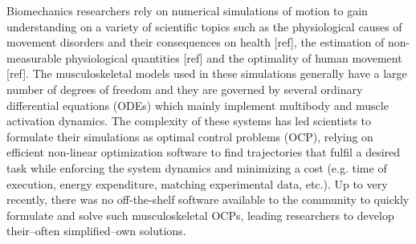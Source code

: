 Biomechanics researchers rely on numerical simulations of motion to gain understanding on a variety of scientific topics such as the physiological causes of movement disorders and their consequences on health [ref], the estimation of non-measurable physiological quantities [ref] and the optimality of human movement [ref].
The musculoskeletal models used in these simulations generally have a large number of degrees of freedom and they are governed by several ordinary differential equations (ODEs) which mainly implement multibody and muscle activation dynamics.
The complexity of these systems has led scientists to formulate their simulations as optimal control problems (OCP), relying on efficient non-linear optimization software to find trajectories that fulfil a desired task while enforcing the system dynamics and minimizing a cost (e.g. time of execution, energy expenditure, matching experimental data, etc.).
Up to very recently, there was no off-the-shelf software available to the community to quickly formulate and solve such musculoskeletal OCPs, leading researchers to develop their--often simplified--own solutions.

